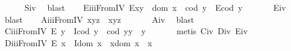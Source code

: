 \begin{isabellebody}
\ \ \ \ %
\endisadelimproof
%
\isatagproof
{}\isamarkupfalse%
\ S\isactrlsub i\isactrlsub v\ \isamarkupfalse%
\ blast%
\endisatagproof
{\isafoldproof}%
%
\isadelimproof
\isanewline
%
\endisadelimproof
\ \ \isamarkupfalse%
\ E\isactrlsub i\isactrlsub i\isactrlsub iFromIV{\isacharcolon}\ {\isachardoublequoteopen}E{\isacharparenleft}x{\isasymcdot}y{\isacharparenright}\ \isactrlbold {\isasymleftarrow}\ {\isacharparenleft}dom\ x\ {\isasymcong}\ cod\ y\ \isactrlbold {\isasymand}\ {\isacharparenleft}E{\isacharparenleft}cod\ y{\isacharparenright}{\isacharparenright}{\isacharparenright}{\isachardoublequoteclose}\ \isanewline
%
\isadelimproof
\ \ \ \ %
\endisadelimproof
%
\isatagproof
{}\isamarkupfalse%
\ E\isactrlsub i\isactrlsub v\ \isamarkupfalse%
\ blast%
\endisatagproof
{\isafoldproof}%
%
\isadelimproof
\isanewline
%
\endisadelimproof
\ \ \isamarkupfalse%
\ A\isactrlsub i\isactrlsub i\isactrlsub iFromIV{\isacharcolon}\ {\isachardoublequoteopen}x{\isasymcdot}{\isacharparenleft}y{\isasymcdot}z{\isacharparenright}\ {\isasymcong}\ {\isacharparenleft}x{\isasymcdot}y{\isacharparenright}{\isasymcdot}z{\isachardoublequoteclose}\ \isanewline
%
\isadelimproof
\ \ \ \ %
\endisadelimproof
%
\isatagproof
{}\isamarkupfalse%
\ A\isactrlsub i\isactrlsub v\ \isamarkupfalse%
\ blast%
\endisatagproof
{\isafoldproof}%
%
\isadelimproof
\isanewline
%
\endisadelimproof
\ \ \isamarkupfalse%
\ C\isactrlsub i\isactrlsub i\isactrlsub iFromIV{\isacharcolon}\ {\isachardoublequoteopen}E\ y\ \isactrlbold {\isasymrightarrow}\ {\isacharparenleft}I{\isacharparenleft}cod\ y{\isacharparenright}\ \isactrlbold {\isasymand}\ {\isacharparenleft}cod\ y{\isacharparenright}{\isasymcdot}y\ {\isasymcong}\ y{\isacharparenright}{\isachardoublequoteclose}\ \isanewline
%
\isadelimproof
\ \ \ \ %
\endisadelimproof
%
\isatagproof
{}\isamarkupfalse%
\ {\isacharparenleft}metis\ C\isactrlsub i\isactrlsub v\ D\isactrlsub i\isactrlsub v\ E\isactrlsub i\isactrlsub v{\isacharparenright}%
\endisatagproof
{\isafoldproof}%
%
\isadelimproof
\isanewline
%
\endisadelimproof
\ \ \isamarkupfalse%
\ D\isactrlsub i\isactrlsub i\isactrlsub iFromIV{\isacharcolon}\ {\isachardoublequoteopen}E\ x\ \isactrlbold {\isasymrightarrow}\ {\isacharparenleft}I{\isacharparenleft}dom\ x{\isacharparenright}\ \isactrlbold {\isasymand}\ x{\isasymcdot}{\isacharparenleft}dom\ x{\isacharparenright}\ {\isasymcong}\ x{\isacharparenright}{\isachardoublequoteclose}\isanewline

\end{isabellebody}
